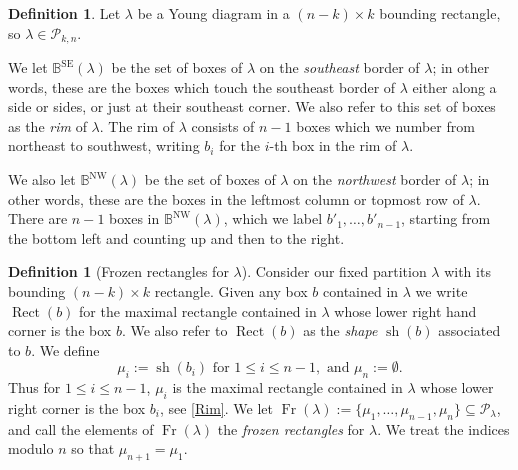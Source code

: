 \documentclass{amsart}
\theoremstyle{definition}
\newtheorem{definition}[thm]{Definition}
\numberwithin{equation}{section}
\newcommand{\Shkn}{{\mathcal P_{k,n}}}
\def\Rect{\operatorname{Rect}}
\def\sh{\operatorname{sh}}
\def\NW{\operatorname{NW}}
\def\SE{\operatorname{SE}}
\newcommand{\BB}{{\mathbb B}}
\newcommand{\Fr}{\operatorname{Fr}}
\begin{document}
\begin{definition}\label{def:BB} 
Let $\lambda$ be a Young diagram in a $(n-k) \times k$
bounding rectangle, so $\lambda\in\Shkn$.

We let 
$\BB^{\SE}(\lambda)$ be the set of boxes of $\lambda$
on the {\it southeast} border of $\lambda$; in other words, these
are the boxes which touch the southeast border of $\lambda$
either along a side or sides, or just at their  southeast corner. We also 
refer to this set of boxes as the \emph{rim} of $\lambda$.
The rim of $\lambda$  consists of $n-1$ boxes which we number
from northeast to southwest, writing 
$b_i$ for the $i$-th box in the rim of $\lambda$. 

We also let 
$\BB^{\NW}(\lambda)$ be the set of boxes of $\lambda$ on the {\it northwest}
border of $\lambda$; in other words, these are the boxes in the leftmost column or topmost row of $\lambda$.  There are $n-1$ boxes in $\BB^{\NW}(\lambda)$, 
which we label $b'_1,\dots,b'_{n-1}$,
starting from the bottom left and counting up and then to the right. 
\end{definition}
\begin{definition}[Frozen rectangles for $\lambda$]\label{d:frozens}
Consider our fixed partition $\lambda$ with its bounding $(n-k)\times k$ rectangle. 
Given any box $b$ contained in 
 $\lambda$ 
we write $\Rect(b)$ for the maximal rectangle contained in $\lambda$ 
whose lower right hand corner is the box $b$.  We also refer to $\Rect(b)$ 
as the \emph{shape} $\sh(b)$ associated to $b$.
We define 
	\[\mu_i:=\sh(b_i) \text{ for }1 \leq i \leq n-1, \text{ and }
\mu_n:=\emptyset
	.\]
Thus for $1\leq i \leq n-1$, $\mu_i$ is the 
maximal rectangle contained in $\lambda$ whose lower right corner is the box $b_i$, see \cref{Rim}.
	We let $\Fr(\lambda) := \{\mu_1,\dots, \mu_{n-1}, \mu_n\} \subseteq \mathcal{P_\lambda}$, and call 
	the elements of $\Fr(\lambda)$ the \emph{frozen rectangles} for $\lambda$. We treat the indices modulo $n$ so that $\mu_{n+1}=\mu_1$.
\end{definition}	
\end{document}
